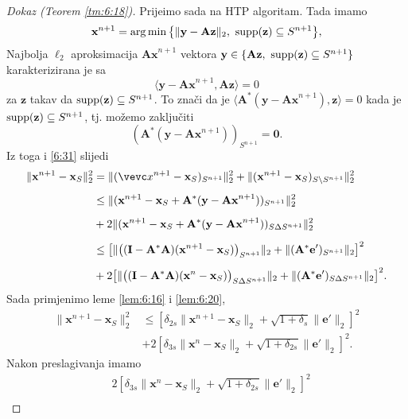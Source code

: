 \documentclass[a4paper,twoside,12pt]{memoir} %
\newcommand{\vect}[1]{\mathbf{#1}}
\renewcommand{\vec}{\vect}
\newcommand{\supp}{\text{\normalfont{supp}}}
\newcommand{\norm}[1]{\|{#1}\|}
\DeclareMathOperator*{\argmin}{arg\,min}
\begin{document}
\begin{proof}[Dokaz (Teorem \ref{tm:6:18})]
    \indent
    Prije\dj imo sada na HTP algoritam. Tada imamo
    \begin{equation*}
        \vec x^{n+1} = \argmin \big\{ \norm{\vec y - \vec{Az}}_2,\ \supp(\vec z) \subseteq S^{n+1} \big\},
    \end{equation*}
    Najbolja $\ell_2$ aproksimacija $\vec {Ax}^{n+1}$ vektora $\vec y \in \{\vec{Az},\ \supp(\vec z) \subseteq S^{n+1}\}$ karakterizirana je sa
    \begin{equation*}
        \langle \vec y - \vec {Ax}^{n+1}, \vec{Az} \rangle = 0 
    \end{equation*}
    za $\vec z$ takav da $\supp(\vec z) \subseteq S^{n+1}$. To zna\v{c}i da je $\langle \vec A^*(\vec y - \vec{Ax}^{n+1}), \vec z \rangle = 0$ kada je $\supp(\vec z) \subseteq S^{n+1}$, tj. mo\v{z}emo zaklju\v{c}iti
    \begin{equation*}
        (\vec A^*(\vec y - \vec {Ax}^{n+1}))_{S^{n+1}} = \vec 0.
    \end{equation*}
    Iz toga i \eqref{6:31} slijedi
    \begin{align*}
        \norm{\vec x^{n+1} - \vec x_S}_2^2 & = \norm{(\vevc x^{n+1} - \vec x_S)_{S^{n+1}}}_2^2 + \norm{(\vec x^{n+1} - \vec x_S)_{S \backslash S^{n+1}}}_2^2\\[0.5em]
        & \leq \norm{(\vec x^{n+1} - \vec x_S + \vec A^*(\vec y - \vec {Ax}^{n+1}))_{S^{n+1}}}_2^2\\[0.5em]
        & + 2 \norm{(\vec x^{n+1} - \vec x_S + \vec A^*(\vec y - \vec {Ax}^{n+1}))_{S \Delta S^{n+1}}}_2^2\\[0.5em]
        & \leq \big[ \norm{\big( (\vec I - \vec A^* \vec A)(\vec x^{n+1} - \vec x_S) \big)_{S^{n+1}}}_2 + \norm{(\vec A^* \vec e')_{S^{n+1}}}_2 \big]^2\\[0.5em]
        & + 2 \big[ \norm{ \big( (\vec I - \vec A^* \vec A)(\vec x^n - \vec x_S) \big)_{S \Delta S^{n+1}} }_2 + \norm{(\vec A^* \vec e')_{S \Delta S^{n+1}}}_2 \big]^2.
    \end{align*}
    Sada primjenimo leme \ref{lem:6:16} i \ref{lem:6:20},
    \begin{align*}
    \norm{\vec x^{n+1} - \vec x_S}_2^2 & \leq [\delta_{2s} \norm{\vec x^{n+1} - \vec x_S}_2 + \sqrt{1+\delta_s} \norm{\vec e'}_2]^2\\[0.5em]
    & + 2 [\delta_{3s} \norm{\vec x^n - \vec x_S}_2 + \sqrt{1 + \delta_{2s}} \norm{\vec e'}_2]^2.
    \end{align*}
    Nakon preslagivanja imamo
    \begin{align*}
        &2[\delta_{3s} \norm{\vec x^n - \vec x_S}_2 + \sqrt{1 + \delta_{2s}} \norm{\vec e '}_2]^2\\[0.5em]

\end{align*}
\end{proof}
\end{document}
